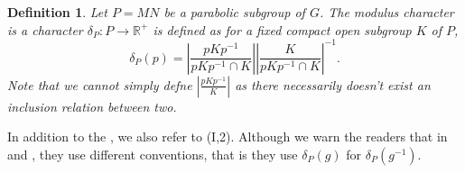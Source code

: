 \documentclass[8pt]{article}
\newtheorem{definition}{Definition}[section]
\newcommand{\R}[0]{\mathbb{R}}
\begin{document}
\begin{definition}
  Let $P=MN$ be a parabolic subgroup of $G$. The modulus character is a character $\delta_P:P\to\R^+$ is defined as for a fixed compact open subgroup $K$ of $P$,
  \begin{equation*}
    \delta_P(p) = \left\vert{\frac {pKp^{-1}} {pKp^{-1}\cap K}}\right\vert\left\vert{\frac {K} {pKp^{-1}\cap K}}\right\vert^{-1}.
  \end{equation*}
  Note that we cannot simply defne $\left\vert{\frac {pKp^{-1}} {K}}\right\vert$ as there necessarily doesn't exist an inclusion relation between two.
\end{definition}
In addition to the \cite{Roche}, we also refer to \cite{Vigneras} (I,2). Although we warn the readers that in \cite{Debacker} and \cite{Renard}, they use different conventions, that is they use $\delta_P(g)$ for $\delta_P(g^{-1})$.
\end{document}

